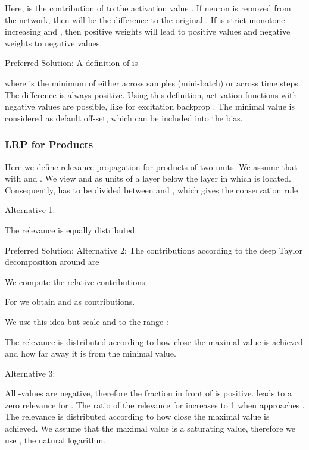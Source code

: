 \documentclass{article}
\begin{document}
\begin{appendices}
Here,  is the contribution of  to the activation
value .
If neuron  is removed from the network,
then   will be the difference to the original .
If  is strict monotone increasing and , then
positive weights  will lead to positive values and negative weights
 to negative values.


\noindent Preferred Solution:\newline
A definition of  is
 
where  is the minimum of  either across samples
(mini-batch) or across time steps.
The difference  is always positive.
Using this definition,
activation functions with negative values are possible, like for
excitation backprop \cite{Zhang:16}.
The minimal value is considered as default off-set, which can be
included into the bias. 


\subsubsection{LRP for Products}
\label{sec:ALRPproduct}


Here we define relevance propagation for products of two units.
We assume that  with  and . 
We view  and  as units of a layer below the layer in
which  is located. Consequently,  has to be divided between  and ,
which gives the conservation rule



Alternative 1:

The relevance is equally distributed.





\noindent Preferred Solution:\newline
Alternative 2:
The contributions according to the deep Taylor decomposition around
 are

We compute the relative contributions:

For  we obtain  and 
as contributions.


We use this idea but scale  and  to the range :

The relevance is distributed according to how close the maximal value
is achieved and how far away it is from the minimal value. 




Alternative 3:

All -values are negative, therefore the fraction in front of
 is positive.  leads to a zero relevance for .
The ratio of the relevance for 
increases to 1 when  approaches . 
The relevance is distributed according to how close the maximal value
is achieved. We assume that the maximal value is a saturating value,
therefore we use , the natural logarithm.




\end{appendices}
\end{document}
